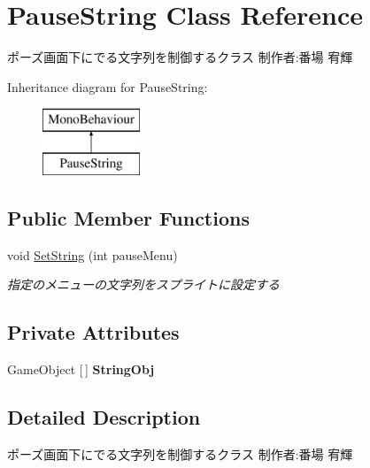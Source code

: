 \hypertarget{class_pause_string}{}\section{Pause\+String Class Reference}
\label{class_pause_string}


ポーズ画面下にでる文字列を制御するクラス 制作者\+:番場 宥輝  


Inheritance diagram for Pause\+String\+:\begin{figure}[H]
\begin{center}
\leavevmode
\includegraphics[height=2.000000cm]{class_pause_string}
\end{center}
\end{figure}
\subsection*{Public Member Functions}
\begin{DoxyCompactItemize}
\item 
void \hyperlink{class_pause_string_aeec0a41f36a344cac3b5592e177cd463}{Set\+String} (int pause\+Menu)
\begin{DoxyCompactList}\small\item\em 指定のメニューの文字列をスプライトに設定する \end{DoxyCompactList}\end{DoxyCompactItemize}
\subsection*{Private Attributes}
\begin{DoxyCompactItemize}
\item 
\mbox{\label{class_pause_string_ad17bc23fd014c18b74fac7d09d5a87f8}} 
Game\+Object \mbox{[}$\,$\mbox{]} {\bfseries String\+Obj}
\end{DoxyCompactItemize}


\subsection{Detailed Description}
ポーズ画面下にでる文字列を制御するクラス 制作者\+:番場 宥輝 



